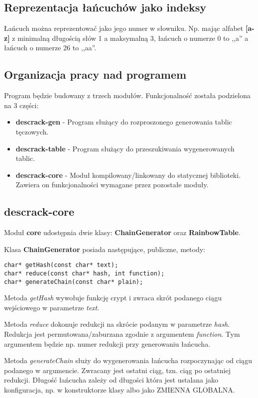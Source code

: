 \documentclass[a4paper,11pt]{article}
\begin{document}
\subsection{Reprezentacja łańcuchów jako indeksy}

Łańcuch można reprezentować jako jego numer w słowniku. Np. mając alfabet \textbf{[a-z]} z minimalną długością słów 1 a maksymalną 3, łańcuch o numerze 0 to ,,a'' a łańcuch o numerze 26 to ,,aa''.

\subsection{Organizacja pracy nad programem}

Program będzie budowany z trzech modułów. Funkcjonalność została podzielona na 3 części:
\begin{itemize}
	\item \textbf{descrack-gen} - Program służący do rozproszonego generowania tablic tęczowych.
	\item \textbf{descrack-table} - Program służący do przeszukiwania wygenerowanych tablic.
	\item \textbf{descrack-core} - Moduł kompilowany/linkowany do statycznej biblioteki. Zawiera on funkcjonalności wymagane przez pozostałe moduły.
\end{itemize}

\subsection{descrack-core}

Moduł \textbf{core} udostępnia dwie klasy: \textbf{ChainGenerator} oraz \textbf{RainbowTable}. 

Klasa \textbf{ChainGenerator} posiada następujące, publiczne, metody:
\begin{lstlisting}
char* getHash(const char* text);
char* reduce(const char* hash, int function);
char* generateChain(const char* plain);
\end{lstlisting}

Metoda \emph{getHash} wywołuje funkcję crypt i zwraca skrót podanego ciągu wejściowego w parametrze \emph{text}.

Metoda \emph{reduce} dokonuje redukcji na skrócie podanym w parametrze \emph{hash}. Redukcja jest permutowana/zaburzana zgodnie z argumentem \emph{function}. Tym argumentem będzie np. numer redukcji przy generowaniu łańcucha.

Metoda \emph{generateChain} służy do wygenerowania łańcucha rozpoczynając od ciągu podanego w argumencie. Zwracany jest ostatni ciąg, tzn. ciąg po ostatniej redukcji. Długość łańcucha zależy od długości która jest ustalana jako konfiguracja, np. w konstruktorze klasy albo jako ZMIENNA GLOBALNA.
\end{document}
